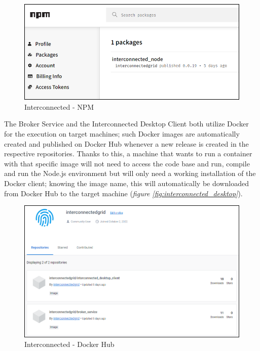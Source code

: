 \begin{figure}[!ht]
    \centering
    \includegraphics[scale=0.45]{document/chapters/chapter_7/images/interconnected_npm.png}
    \caption{Interconnected - NPM}
    \label{fig:interconnected_npm}
\end{figure}

The Broker Service and the Interconnected Desktop Client both utilize Docker for the execution on target machines; such Docker images are automatically created and published on Docker Hub whenever a new release is created in the respective repositories. Thanks to this, a machine that wants to run a container with that specific image will not need to access the code base and run, compile and run the Node.js environment but will only need a working installation of the Docker client; knowing the image name, this will automatically be downloaded from Docker Hub to the target machine (\textit{figure \ref{fig:interconnected_desktop}}). 

\begin{figure}[!ht]
    \centering
    \includegraphics[width=\linewidth]{document/chapters/chapter_7/images/interconnected_dockerhub.png}
    \caption{Interconnected - Docker Hub}
    \label{fig:interconnected_dockerhub}
\end{figure}


